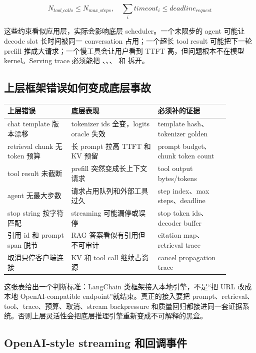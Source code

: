 \[
N_{tool\_calls} \le N_{max\_steps}, \quad
\sum_i timeout_i \le deadline_{request}
\]

这些约束看似应用层，实际会影响底层 scheduler。一个未限步的 agent 可能让 decode slot 长时间被同一 conversation 占用；一个超长 tool result 可能把下一轮 prefill 推成大请求；一个慢工具会让用户看到 TTFT 高，但问题根本不在模型 kernel。Serving trace 必须能把 、、、 和  拆开。

\subsection{上层框架错误如何变成底层事故}

\begin{center}
\small
\begin{tabular}{p{0.25\linewidth}p{0.34\linewidth}p{0.29\linewidth}}
\toprule
上层错误 & 底层表现 & 必须补的证据 \\
\midrule
chat template 版本漂移 & tokenizer ids 全变，logits oracle 失效 & template hash、tokenizer golden \\
retrieval chunk 无 token 预算 & 长 prompt 拉高 TTFT 和 KV 预留 & prompt budget、chunk token count \\
tool result 未截断 & prefill 突然变成长上下文请求 & tool output bytes/tokens \\
agent 无最大步数 & 请求占用队列和外部工具过久 & step index、max steps、deadline \\
stop string 按字符匹配 & streaming 可能漏停或误停 & stop token ids、decoder buffer \\
引用 id 和 prompt span 脱节 & RAG 答案看似有引用但不可审计 & citation map、retrieval trace \\
取消只停客户端连接 & KV 和 tool call 继续占资源 & cancel propagation trace \\
\bottomrule
\end{tabular}
\end{center}

这张表给出一个判断标准：LangChain 类框架接入本地引擎，不是“把 URL 改成本地 OpenAI-compatible endpoint”就结束。真正的接入要把 prompt、retrieval、tool、trace、预算、取消、stream backpressure 和质量回归都接进同一套证据系统。否则上层灵活性会把底层推理引擎重新变成不可解释的黑盒。

\subsection{OpenAI-style streaming 和回调事件}

